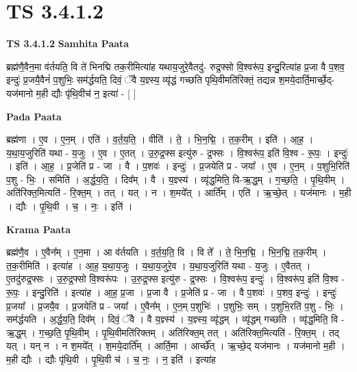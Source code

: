 \documentclass[17pt]{extarticle}
\begin{document}
\section{ TS 3.4.1.2 }

\textbf{TS 3.4.1.2 } \newline
\textbf{Samhita Paata} \newline

ब्रह्म॑णै॒वैन॒मा व॑र्तयति॒ वि ते॑ भिनद्मि तक॒रीमित्या॑ह यथाय॒जुरे॒वैतदु॑- रुद्र॒फ्सो वि॒श्वरू॑प॒ इन्दु॒रित्या॑ह प्र॒जा वै प॒शव॒ इन्दुः॑ प्र॒जयै॒वैनं॑ प॒शुभिः॒ सम॑र्द्धयति॒ दिवं॒ ॅवै य॒ज्ञ्स्य॒ व्यृ॑द्धं गच्छति पृथि॒वीमति॑रिक्तं॒ तद्यन्न श॒मये॒दार्ति॒मार्च्छे॒द्-यज॑मानो म॒ही द्यौः पृ॑थि॒वीच॑ न॒ इत्या॑ - [  ] \newline

\textbf{Pada Paata} \newline

ब्रह्म॑णा । ए॒व । ए॒न॒म् । एति॑ । व॒र्त॒य॒ति॒ । वीति॑ । ते॒ । भि॒न॒द्मि॒ । त॒क॒रीम् । इति॑ । आ॒ह॒ । य॒था॒य॒जुरिति॑ यथा - य॒जुः । ए॒व । ए॒तत् । उ॒रु॒द्र॒फ्स इत्यु॑रु - द्र॒फ्सः । वि॒श्वरू॑प॒ इति॑ वि॒श्व - रू॒पः॒ । इन्दुः॑ । इति॑ । आ॒ह॒ । प्र॒जेति॑ प्र - जा । वै । प॒शवः॑ । इन्दुः॑ । प्र॒जयेति॑ प्र - जया᳚ । ए॒व । ए॒न॒म् । प॒शुभि॒रिति॑ प॒शु - भिः॒ । समिति॑ । अ॒र्द्ध॒य॒ति॒ । दिव᳚म् । वै । य॒ज्ञ्स्य॑ । व्यृ॑द्ध॒मिति॒ वि-ऋ॒द्ध॒म् । ग॒च्छ॒ति॒ । पृ॒थि॒वीम् । अति॑रिक्त॒मित्यति॑ - रि॒क्त॒म् । तत् । यत् । न । श॒मये᳚त् । आर्ति᳚म् । एति॑ । ऋ॒च्छे॒त् । यज॑मानः । म॒ही । द्यौः । पृ॒थि॒वी । च॒ । नः॒ । इति॑ ।  \newline


\textbf{Krama Paata} \newline

ब्रह्म॑णै॒व । ए॒वैन᳚म् । ए॒न॒मा । आ व॑र्तयति । व॒र्त॒य॒ति॒ वि । वि ते᳚ । ते॒ भि॒न॒द्मि॒ । भि॒न॒द्मि॒ त॒क॒रीम् । त॒क॒रीमिति॑ । इत्या॑ह । आ॒ह॒ य॒था॒य॒जुः । य॒था॒य॒जुरे॒व । य॒था॒य॒जुरिति॑ यथा - य॒जुः । ए॒वैतत् । ए॒तदु॑रुद्र॒फ्सः । उ॒रु॒द्र॒फ्सो वि॒श्वरू॑पः । उ॒रु॒द्र॒फ्स इत्यु॑रु - द्र॒फ्सः । वि॒श्वरू॑प॒ इन्दुः॑ । वि॒श्वरू॑प॒ इति॑ वि॒श्व - रू॒पः॒ । इन्दु॒रिति॑ । इत्या॑ह । आ॒ह॒ प्र॒जा । प्र॒जा वै । प्र॒जेति॑ प्र - जा । वै प॒शवः॑ । प॒शव॒ इन्दुः॑ । इन्दुः॑ प्र॒जया᳚ । प्र॒जयै॒व । प्र॒जयेति॑ प्र - जया᳚ । ए॒वैन᳚म् । ए॒न॒म् प॒शुभिः॑ । प॒शुभिः॒ सम् । प॒शुभि॒रति॑ प॒शु - भिः॒ । सम॑र्द्धयति । अ॒र्द्ध॒य॒ति॒ दिव᳚म् । दिवं॒ ॅवै । वै य॒ज्ञ्स्य॑ । य॒ज्ञ्स्य॒ व्यृ॑द्धम् । व्यृ॑द्धम् गच्छति । व्यृ॑द्ध॒मिति॒ वि - ऋ॒द्ध॒म् । ग॒च्छ॒ति॒ पृ॒थि॒वीम् । पृ॒थि॒वीमति॑रिक्तम् । अति॑रिक्त॒म् तत् । अति॑रिक्त॒मित्यति॑ - रि॒क्त॒म् । तद् यत् । यन् न । न श॒मये᳚त् । श॒मये॒दार्ति᳚म् । आर्ति॒मा । आर्च्छे᳚त् । ऋ॒च्छे॒द् यज॑मानः । यज॑मानो म॒ही । म॒ही द्यौः । द्यौः पृ॑थि॒वी । पृ॒थि॒वी च॑ । च॒ नः॒ । न॒ इति॑ । इत्या॑ह \newline
\end{document}
